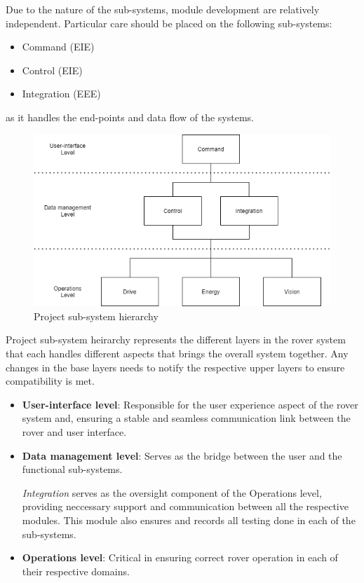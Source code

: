 \documentclass[10pt, a4paper]{article}
\begin{document}
Due to the nature of the sub-systems, module development are relatively independent. Particular care should be placed on the following sub-systems:
\begin{itemize}
    \item Command (EIE) 
    \item Control (EIE)
    \item Integration (EEE)
\end{itemize}
as it handles the end-points and data flow of the systems.

\begin{figure} [h!]
    \centering
    \includegraphics[scale=0.6]{project heirarchy.png}
    \caption{Project sub-system hierarchy}
\end{figure}

Project sub-system heirarchy represents the different layers in the rover system that each handles different aspects that brings the overall system together. Any changes in the base layers needs to notify the respective upper layers to ensure compatibility is met.

\begin{itemize}  
    \item \textbf{User-interface level}: Responsible for the user experience aspect of the rover system and, ensuring a stable and seamless communication link between the rover and user interface. 
    
    \item \textbf{Data management level}: Serves as the bridge between the user and the functional sub-systems. 
    
    \textit{Integration} serves as the oversight component of the Operations level, providing neccessary support and communication between all the respective modules. This module also ensures and records all testing done in each of the sub-systems.

    \item \textbf{Operations level}: Critical in ensuring correct rover operation in each of their respective domains. 
\end{itemize}
\end{document}

